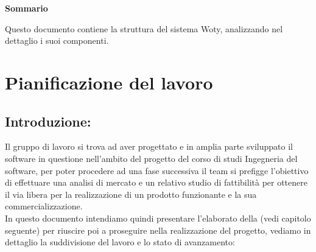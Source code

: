 
\newpage

\vspace*{0.5cm} %
\begin{center}

\textbf{{\huge{Sommario}}}

Questo documento contiene la struttura del sistema Woty, analizzando nel dettaglio i suoi componenti.

\vspace*{0.2cm} %

\end{center}






\newpage

\tableofcontents %

\let\cleardoublepage\clearpage %

\listoftables

\listoffigures




\newpage
\section{Pianificazione del lavoro}

\subsection{Introduzione:}
Il gruppo di lavoro si trova ad aver progettato e in amplia parte sviluppato il software in questione nell'ambito del progetto del corso di studi Ingegneria del software, per poter procedere ad una fase successiva il team si prefigge l'obiettivo di effettuare una analisi di mercato e un relativo studio di fattibilità per ottenere il via libera per la realizzazione di un prodotto funzionante e la sua commercializzazione.\\In questo documento intendiamo quindi presentare l'elaborato della  (vedi capitolo seguente) per riuscire poi a proseguire nella realizzazione del progetto, vediamo in dettaglio la suddivisione del lavoro e lo stato di avanzamento:

